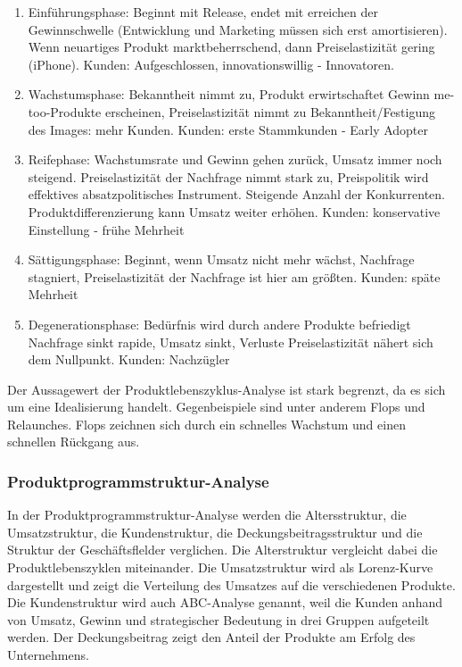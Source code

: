 {\begin{enumerate}
	\item Einführungsphase: Beginnt mit Release, endet mit erreichen der Gewinnschwelle (Entwicklung und Marketing müssen sich erst amortisieren). Wenn neuartiges Produkt marktbeherrschend, dann Preiselastizität gering (iPhone). Kunden: Aufgeschlossen, innovationswillig - Innovatoren.
	\item Wachstumsphase: Bekanntheit nimmt zu, Produkt erwirtschaftet Gewinn me-too-Produkte erscheinen, Preiselastizität nimmt zu Bekanntheit/Festigung des Images: mehr Kunden. Kunden: erste Stammkunden - Early Adopter
	\item Reifephase: Wachstumsrate und Gewinn gehen zurück, Umsatz immer noch steigend. Preiselastizität der Nachfrage nimmt stark zu,  Preispolitik wird effektives absatzpolitisches Instrument. Steigende Anzahl der Konkurrenten. Produktdifferenzierung kann Umsatz weiter erhöhen. Kunden: konservative Einstellung - frühe Mehrheit
	\item Sättigungsphase: Beginnt, wenn Umsatz nicht mehr wächst, Nachfrage stagniert, Preiselastizität der Nachfrage ist hier am größten. Kunden: späte Mehrheit
	\item Degenerationsphase: Bedürfnis wird durch andere Produkte befriedigt Nachfrage sinkt rapide, Umsatz sinkt, Verluste Preiselastizität nähert sich dem Nullpunkt. Kunden: Nachzügler 
\end{enumerate}

Der Aussagewert der Produktlebenszyklus-Analyse ist stark begrenzt, da es sich um eine Idealisierung handelt. Gegenbeispiele sind unter anderem Flops und Relaunches. Flops zeichnen sich durch ein schnelles Wachstum und einen schnellen Rückgang aus.

\subsubsection{Produktprogrammstruktur-Analyse}

In der Produktprogrammstruktur-Analyse werden die Altersstruktur, die Umsatzstruktur, die Kundenstruktur, die Deckungsbeitragsstruktur und die Struktur der Geschäftsflelder verglichen. Die Alterstruktur vergleicht dabei die Produktlebenszyklen miteinander. Die Umsatzstruktur wird als Lorenz-Kurve dargestellt und zeigt die Verteilung des Umsatzes auf die verschiedenen Produkte. Die Kundenstruktur wird auch ABC-Analyse genannt, weil die Kunden anhand von Umsatz, Gewinn und strategischer Bedeutung in drei Gruppen aufgeteilt werden. Der Deckungsbeitrag zeigt den Anteil der Produkte am Erfolg des Unternehmens.

}
